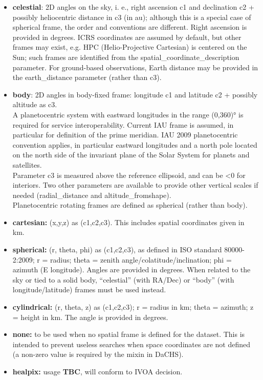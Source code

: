 \documentclass[11pt,a4paper]{ivoa}
\begin{document}
\begin{itemize}
\item \textbf{celestial}: 2D angles on the sky, i. e., right ascension c1 and declination c2 + possibly heliocentric distance in c3 (in au); although this is a special case of spherical frame, the order and conventions are different. Right ascension is provided in degrees. ICRS coordinates are assumed by default, but other frames may exist, e.g. HPC (Helio-Projective Cartesian) is centered on the Sun; such frames are identified from the spatial\_coordinate\_description parameter. For ground-based observations, Earth distance may be provided in the earth\_distance parameter (rather than c3). 
\item \textbf{body}: 2D angles in body-fixed frame: longitude c1 and latitude c2 + possibly altitude as c3. \\A planetocentric system with eastward longitudes in the range (0,360)° is required for service interoperability. Current IAU frame is assumed, in particular for definition of the prime meridian. IAU 2009 planetocentric convention applies, in particular eastward longitudes and a north pole located on the north side of the invariant plane of the Solar System for planets and satellites.  \\Parameter c3 is measured above the reference ellipsoid, and can be <0 for interiors. Two other parameters are available to provide other vertical scales if needed (radial\_distance and altitude\_fromshape). \\Planetocentric rotating frames are defined as spherical (rather than body).
\item \textbf{cartesian:} (x,y,z) as (c1,c2,c3). This includes spatial coordinates given in km. 
\item \textbf{spherical:} (r, theta, phi) as (c1,c2,c3), as defined in ISO standard 80000-2:2009; r = radius; theta = zenith angle/colatitude/inclination; phi = azimuth (E longitude). Angles are provided in degrees. When related to the sky or tied to a solid body, ``celestial'' (with RA/Dec) or ``body'' (with longitude/latitude) frames must be used instead.
\item \textbf{cylindrical:} (r, theta, z) as (c1,c2,c3); r = radius in km; theta = azimuth; z = height in km. The angle is provided in degrees.
\item \textbf{none:} to be used when no spatial frame is defined for the dataset. This is intended to prevent useless searches when space coordinates are not defined (a non-zero value is required by the mixin in DaCHS).
\item \textbf{healpix:} usage \textbf{TBC}, will conform to IVOA decision.
\end{itemize}
\end{document}
